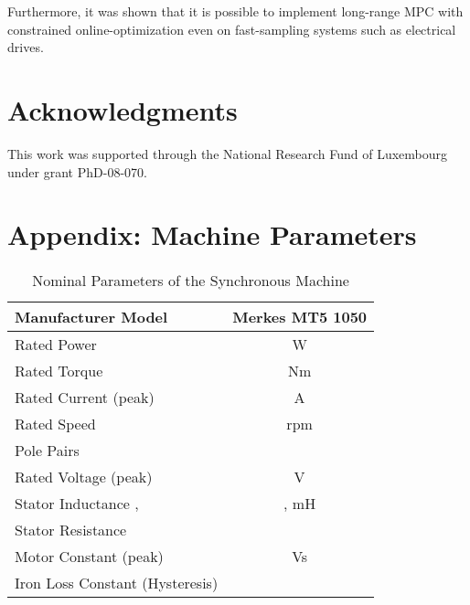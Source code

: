\documentclass[a4paper,11pt,fleqn]{article}
\begin{document}
Furthermore, it was shown that it is possible to implement long-range MPC with constrained online-optimization even on fast-sampling systems such as electrical drives.





\section*{Acknowledgments}
This work was supported through the National Research Fund of Luxembourg under grant PhD-08-070.

\clearpage


\section*{Appendix: Machine Parameters}

\begin{table}[!h]
\renewcommand{\arraystretch}{1.0}
\caption{Nominal Parameters of the Synchronous Machine\label{tbl:SMparameter}}
\centering
\begin{tabular}{|l||c|}
\hline
Manufacturer  Model  & Merkes MT5 1050   \\
\hline
Rated Power          &   W  \\ \hline
Rated Torque   &   Nm  \\
\hline
Rated Current   (peak)      &   A \\
\hline
Rated Speed  &   rpm \\
\hline
Pole Pairs           &   \\
\hline
Rated Voltage    (peak)  &   V \\
\hline
Stator Inductance ,      &  ,  mH \\
\hline
Stator Resistance      &    \\
\hline
Motor Constant   (peak)   &   Vs \\
\hline
Iron  Loss Constant (Hysteresis)         &    \\
\hline
\end{tabular}
\end{table}
\end{document}
